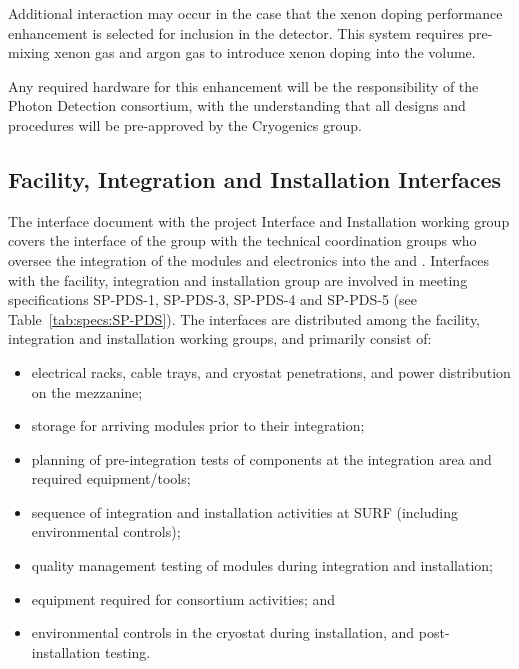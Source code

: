 Additional interaction may occur in the case that the xenon doping performance enhancement is selected for inclusion in the detector.  This system requires pre-mixing xenon gas and argon gas to introduce xenon doping into the \lar volume. 


Any required hardware for this enhancement will be the responsibility of the Photon Detection consortium, with the understanding that all designs and procedures will be pre-approved by the Cryogenics group. 


\subsection{Facility, Integration and Installation Interfaces}

The interface document with the project Interface and Installation working group covers the interface of the  group with the technical coordination groups who oversee the integration of the  modules and electronics into the  and . Interfaces with the facility, integration and installation group are involved in meeting specifications SP-PDS-1, SP-PDS-3, SP-PDS-4 and SP-PDS-5 (see Table~\ref{tab:specs:SP-PDS}).  The interfaces are distributed among the facility, integration and installation working groups, and primarily consist of:
\begin{itemize}
    \item electrical racks, cable trays, and cryostat penetrations, and power distribution on the mezzanine;
    \item storage for arriving  modules prior to their integration;
    \item planning of pre-integration tests of  components at the integration area and required equipment/tools;
    \item sequence of integration and installation activities at SURF (including environmental controls);
    \item quality management testing of  modules during integration and installation;
    \item equipment required for  consortium activities; and
    \item environmental controls in the cryostat during installation, and post-installation testing.
\end{itemize}

